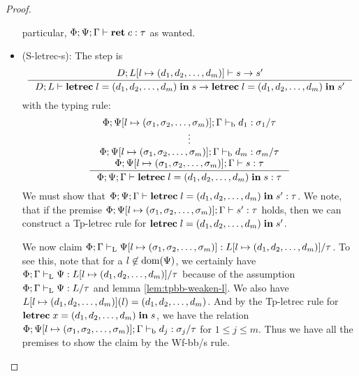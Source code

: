 \documentclass[a4paper, oneside, 10pt, draft]{memoir}
\begin{document}
\begin{proof}
\begin{itemize}
    particular, $\Phi;\Psi;\Gamma |- \mathbf{ret} \; c : \tau$ as wanted.
  \item (S-letrec-s):
    The step is
      \begin{equation*}
        \inference{D;L[l \mapsto \dbundle] |- s -> s'}
        {D;L |- \iletrec{l}{\dbundle}{s} -> \iletrec{l}{\dbundle}{s'}}
      \end{equation*}
    with the typing rule:
        \begin{equation}
          \label{eq:preserv-tp-letrec-s}
          \inference{\Phi;\Psi[l \mapsto \bbtypes];\Gamma \tpb d_1 :
            \sigma_1 / \tau\\
            \vdots\\
            \Phi;\Psi[l \mapsto \bbtypes];\Gamma \tpb d_m : \sigma_m
            / \tau\\
            \Phi;\Psi[l \mapsto \bbtypes];\Gamma |- s : \tau}
          {\Phi;\Psi;\Gamma |- \iletrec{l}{\dbundle}{s} : \tau}\\\\
    \end{equation}
    We must show that $\Phi;\Psi;\Gamma |- \mathbf{letrec} \; l = (d_1, d_2, \dotsc, d_m) \; \mathbf{in} \; s' :
    \tau$. We note, that if the premise $\Phi;\Psi[l \mapsto
    (\sigma_1, \sigma_2, \dotsc, \sigma_m)];\Gamma |- s' : \tau$ holds, then we can construct a
    Tp-letrec rule for $\mathbf{letrec} \; l = (d_1, d_2, \dotsc, d_m) \; \mathbf{in} \; s'$.

    We now claim $\Phi;\Gamma |-_{\mathrm{L}} \Psi[l \mapsto (\sigma_1, \sigma_2, \dotsc, \sigma_m)] :
    L[l\mapsto (d_1, d_2, \dotsc, d_m)] / \tau$. To see this, note that for a $l \not
    \in \mathrm{dom}(\Psi)$, we certainly have
    $\Phi;\Gamma |-_{\mathrm{L}} \Psi : L[l\mapsto (d_1, d_2, \dotsc, d_m)] / \tau$ because of
    the assumption $\Phi;\Gamma |-_{\mathrm{L}} \Psi : L / \tau$ and lemma
    \ref{lem:tpbb-weaken-l}. We also have $L[l\mapsto (d_1, d_2, \dotsc, d_m)](l) =
    (d_1, d_2, \dotsc, d_m)$. And by the Tp-letrec rule for
    $\mathbf{letrec} \; x = (d_1, d_2, \dotsc, d_m) \; \mathbf{in} \; s$, we have the relation $\Phi;\Psi[l
    \mapsto (\sigma_1, \sigma_2, \dotsc, \sigma_m)];\Gamma |-_{\mathrm{b}} d_j : \sigma_j / \tau$ for $1 \leq j
    \leq m$. Thus we have all the premises to show the claim by the
    Wf-bb/s rule.


\end{itemize}
\end{proof}
\end{document}
